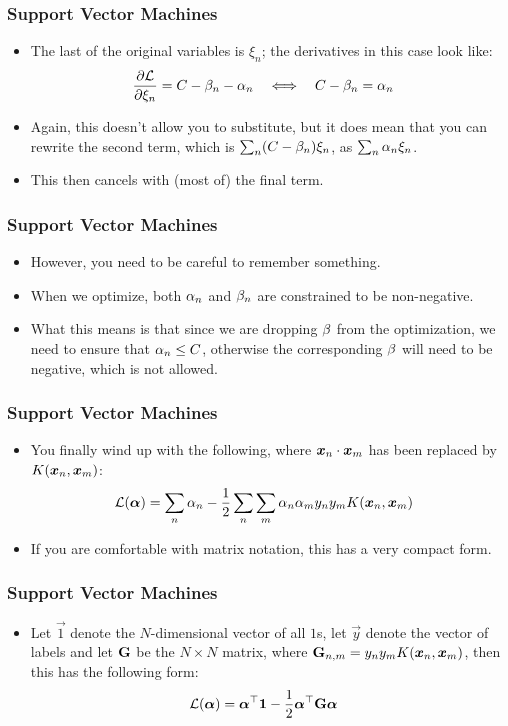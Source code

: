 \documentclass[trans]{beamer}
\begin{document}
\begin{frame}
  \frametitle{Support Vector Machines}
\begin{itemize}
\item 
The last of the original variables is $\xi_n$; the derivatives in this
case look like:
%
\begin{align}
\frac {\partial \mathcal{L}} {\partial \xi_n}
&= C - \beta_n - \alpha_n
\quad \Longleftrightarrow \quad
C - \beta_n = \alpha_n
\end{align}
%
\item
Again, this doesn't allow you to substitute, but it does mean that you
can rewrite the second term, which is $\sum_n (C-\beta_n)\xi_n$, as
$\sum_n \alpha_n \xi_n$. 
\item This then cancels with (most of) the final
term. 
\end{itemize}
\end{frame}

\begin{frame}
  \frametitle{Support Vector Machines}
\begin{itemize}
\item 
 However, you need to be careful to remember something.
 \item  When we
optimize, both $\alpha_n$ and $\beta_n$ are constrained to be non-negative.
\item What this means is that since we are dropping $\beta$ from the
optimization, we need to ensure that $\alpha_n \leq C$, otherwise the
corresponding $\beta$ will need to be negative, which is not allowed.
\end{itemize}
\end{frame}

\begin{frame}
  \frametitle{Support Vector Machines}
\begin{itemize}
\item 
You finally wind up with the following, where ${\boldsymbol{x}}_n \cdot {\boldsymbol{x}}_m$
has been replaced by $K({\boldsymbol{x}}_n,{\boldsymbol{x}}_m)$:
%
\begin{align}
\mathcal{L}(\boldsymbol{\alpha})
&=
\sum_n \alpha_n
- \frac 1 2
    \sum_n \sum_m \alpha_n \alpha_m y_n y_m K({\boldsymbol{x}}_n,{\boldsymbol{x}}_m)
\end{align}
%
\item 
If you are comfortable with matrix notation, this has a very compact
form. 
\end{itemize}
\end{frame}

\begin{frame}
  \frametitle{Support Vector Machines}
\begin{itemize}
\item 
 Let $\vec 1$ denote the $N$-dimensional vector of all $1$s, 
let $\vec y$ denote the vector of labels and let $\text{\bf G}$ be the $N
\times N$ matrix, where $\text{\bf G}_{n,m} = y_n y_m K({\boldsymbol{x}}_n, {\boldsymbol{x}}_m)$, then this
has the following form:
%
\begin{align}
\mathcal{L}(\boldsymbol{\alpha})
&=
\boldsymbol{\alpha}{}^\top\boldsymbol{1}
- \frac 1 2 \boldsymbol{\alpha}{}^\top \text{\bf G} \boldsymbol{\alpha}
\end{align}
%
\end{itemize}
\end{frame}
\end{document}
